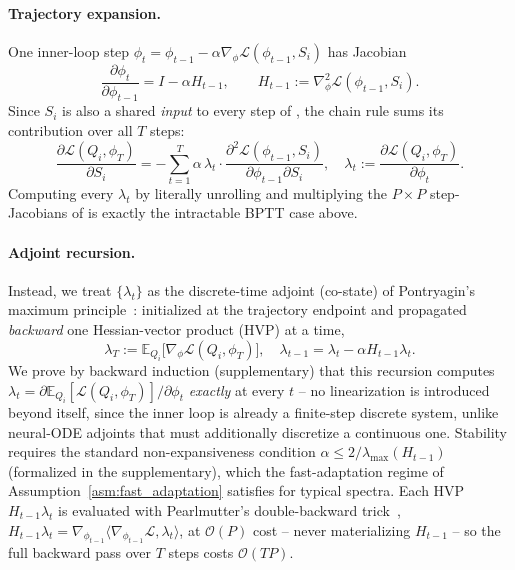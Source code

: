 \paragraph{Trajectory expansion.}
One inner-loop step $\phi_t=\phi_{t-1}-\alpha\nabla_\phi\mathcal{L}(\phi_{t-1},S_i)$ has Jacobian
\begin{equation}
    \frac{\partial\phi_t}{\partial\phi_{t-1}} = I-\alpha H_{t-1},\qquad H_{t-1}:=\nabla^2_\phi\mathcal{L}(\phi_{t-1},S_i).
    \label{eq:step_jacobian}
\end{equation}
Since $S_i$ is also a shared \emph{input} to every step of , the chain rule sums its contribution over all $T$ steps:
\begin{equation}
    \frac{\partial\mathcal{L}(Q_i,\phi_T)}{\partial S_i} = -\sum_{t=1}^{T}\alpha\,\lambda_t\cdot\frac{\partial^2\mathcal{L}(\phi_{t-1},S_i)}{\partial\phi_{t-1}\partial S_i},\quad
    \lambda_t := \frac{\partial\mathcal{L}(Q_i,\phi_T)}{\partial\phi_t}.
    \label{eq:trajectory_expansion}
\end{equation}
Computing every $\lambda_t$ by literally unrolling and multiplying the $P\times P$ step-Jacobians of  is exactly the intractable BPTT case above.

\paragraph{Adjoint recursion.}
Instead, we treat $\{\lambda_t\}$ as the discrete-time adjoint (co-state) of Pontryagin's maximum principle~\cite{pontryagin1962mathematical}: initialized at the trajectory endpoint and propagated \emph{backward} one Hessian-vector product (HVP) at a time,
\begin{equation}
    \lambda_T := \mathbb{E}_{Q_i}\!\big[\nabla_\phi\mathcal{L}(Q_i,\phi_T)\big],\quad
    \lambda_{t-1} = \lambda_t - \alpha H_{t-1}\lambda_t.
    \label{eq:adjoint_recursion}
\end{equation}
We prove by backward induction (supplementary) that this recursion computes $\lambda_t=\partial\mathbb{E}_{Q_i}[\mathcal{L}(Q_i,\phi_T)]/\partial\phi_t$ \emph{exactly} at every $t$ -- no linearization is introduced beyond  itself, since the inner loop is already a finite-step discrete system, unlike neural-ODE adjoints that must additionally discretize a continuous one. Stability requires the standard non-expansiveness condition $\alpha\le 2/\lambda_{\max}(H_{t-1})$ (formalized in the supplementary), which the fast-adaptation regime of Assumption~\ref{asm:fast_adaptation} satisfies for typical spectra. Each HVP $H_{t-1}\lambda_t$ is evaluated with Pearlmutter's double-backward trick~\cite{pearlmutter1994fast}, $H_{t-1}\lambda_t=\nabla_{\phi_{t-1}}\langle\nabla_{\phi_{t-1}}\mathcal{L},\lambda_t\rangle$, at $\mathcal{O}(P)$ cost -- never materializing $H_{t-1}$ -- so the full backward pass over $T$ steps costs $\mathcal{O}(TP)$.

